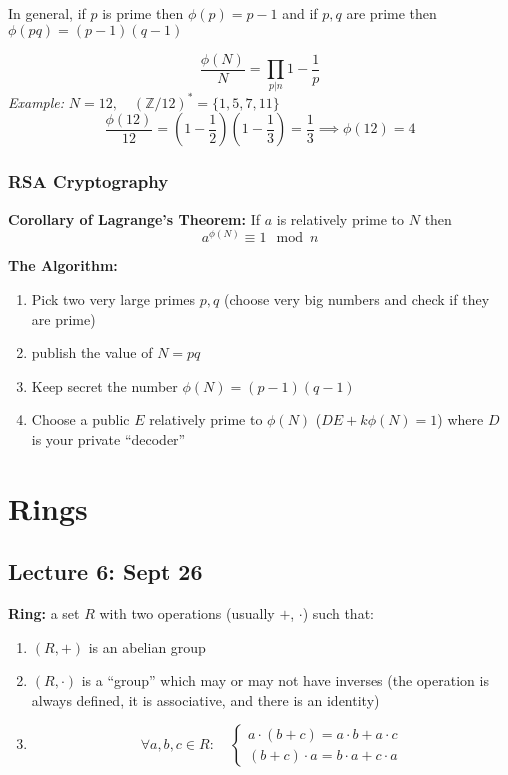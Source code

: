 \documentclass[12pt]{report}
\newcommand{\Z}{\mathbb{Z}}
\begin{document}
In general, if $p$ is prime then $\phi(p) = p -1$ and if $p, q$ are prime then $\phi(pq) = (p - 1)(q - 1)$

\[\boxed{\frac{\phi(N)}{N} = \prod_{p | n} 1 - \frac{1}{p}}\]
\emph{Example:} $N=12, \quad (\Z/12)^* = \{1, 5, 7, 11\}$
\[\frac{\phi(12)}{12} = (1 - \frac{1}{2})(1 - \frac{1}{3}) = \frac{1}{3} \implies \phi(12) = 4\]

\subsection*{RSA Cryptography}
\textbf{Corollary of Lagrange's Theorem:} If $a$ is relatively prime to $N$ then 
\[a^{\phi(N)} \equiv 1 \mod n\]

\textbf{The Algorithm:}
\begin{enumerate}
    \item Pick two very large primes $p, q$ (choose very big numbers and check if they are prime)
    \item publish the value of $N = pq$ 
    \item Keep secret the number $\phi(N) = (p-1)(q-1)$
    \item Choose a public $E$ relatively prime to $\phi(N)$ ($DE + k\phi(N) = 1$) where $D$ is your private ``decoder''
\end{enumerate}

\chapter*{Rings}
\section*{Lecture 6: Sept 26}
\textbf{Ring:} a set $R$ with two operations (usually $+$, \; $\cdot$) such that:
\begin{enumerate}
    \item $(R, +)$ is an abelian group 
    \item $(R, \cdot)$ is a ``group'' which may or may not have inverses (the operation is always defined, it is associative, and there is an identity) 
    \item 
    \[\forall a, b, c \in R : \quad \begin{cases}
        a \cdot (b + c) = a\cdot b + a \cdot c\\
        (b + c) \cdot a = b\cdot a + c\cdot a
    \end{cases}\]
\end{enumerate}
\end{document}
